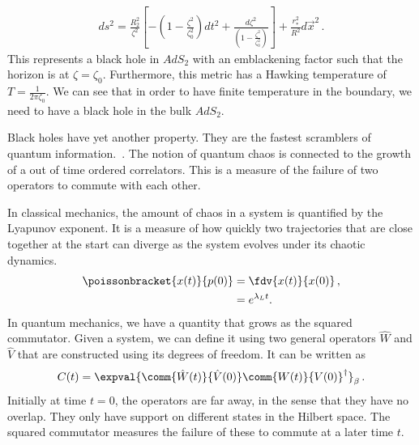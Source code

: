 \begin{align}
    ds^2 = \frac{R_2^2}{\zeta^2}\left[-\left(1-\frac{\zeta^2}{\zeta_0^2}\right)dt^2 + \frac{d\zeta^2}{\left(1 - \frac{\zeta^2}{\zeta_0^2}\right)}\right] + \frac{r_\ast^2}{R^2} d\vec{x}^2 \,.
\end{align}
This represents a black hole in $AdS_2$ with an emblackening factor such that the horizon is at $\zeta = \zeta_0$. Furthermore, this metric has a Hawking temperature of $T = \frac{1}{2\pi\zeta_0}$. We can see that in order to have finite temperature in the boundary, we need to have a black hole in the bulk $AdS_2$. 

Black holes have yet another property. They are the fastest scramblers of quantum information.~\cite{maldacena_bound_2016,shenker2014black,shenker2015stringy,stanford_many-body_2016,grozdanov2018black,bagrets2016sachdev}.
The notion of quantum chaos is connected to the growth of a out of time ordered correlators. This is a measure of the failure of two operators to commute with each other. 
\par
In classical mechanics, the amount of chaos in a system is quantified by the Lyapunov exponent. It is a measure of how quickly two trajectories that are close together at the start can diverge as the system evolves under its chaotic dynamics. 
\begin{align}
    \poissonbracket{x(t)}{p(0)} &= \fdv{x(t)}{x(0)} \, , \nonumber \\
    &= e^{\lambda_L t}.
\end{align}
In quantum mechanics, we have a quantity that grows as the squared commutator. Given a system, we can define it using two general operators $\hat{W}$ and $\hat{V}$ that are constructed using its degrees of freedom. 
It can be written as~\cite{stanford_many-body_2016}
\begin{align}
    C(t) = \expval{\comm{\hat{W}(t)}{\hat{V}(0)}\comm{W(t)}{V(0)}^\dagger}_
    \beta \,.
\end{align}
Initially at time $t=0$, the operators are far away, in the sense that they have no overlap. They only have support on different states in the Hilbert space. The squared commutator measures the failure of these to commute at a later time $t$. 

